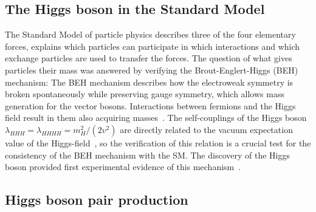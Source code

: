\label{sec:theory}

\subsection{The Higgs boson in the Standard Model}

The Standard Model of particle physics describes three of the four elementary forces, explains which particles can participate in which interactions and which exchange particles are
used to transfer the forces. The question of what gives particles their mass was answered by verifying the Brout-Englert-Higgs (BEH) mechanism: The BEH mechanism describes how the electroweak symmetry
is broken spontaneously while preserving gauge symmetry, which allows mass generation for the vector bosons. Interactions between fermions and the Higgs field result in them also acquiring masses~\cite{Guerrero:2021}. The self-couplings of the Higgs boson $\lambda_{HHH} = \lambda_{HHHH} = m_H^2/(2v^2)$ are directly related
to the vacuum expectation value of the Higgs-field~\cite{HandbookLHC}, so the verification of this relation is a crucial test for the consistency of the BEH mechanism with the SM. 
The discovery of the Higgs boson provided first experimental evidence of this mechanism~\cite{Guerrero:2021}.\\



\subsection{Higgs boson pair production}
\label{sec:sig_processes}

